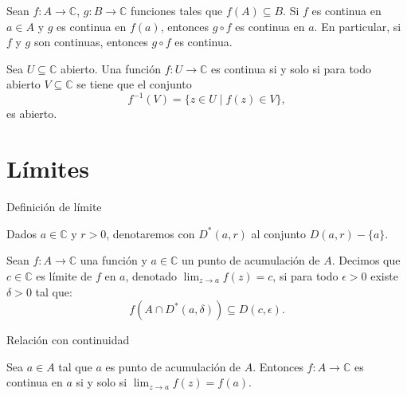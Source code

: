 \documentclass[spanish,presentation]{beamer}
\begin{document}
\begin{frame}[label=sec-1-3]{}
\begin{theorem}
Sean \(f\colon A\to \mathbb{C}\), \(g\colon B\to \mathbb{C}\)
funciones tales que \(f(A)\subseteq B\). Si \(f\) es continua en
\(a\in A\) y \(g\) es continua en \(f(a)\), entonces \(g\circ f\)
es continua en \(a\). En particular, si \(f\) y \(g\) son
continuas, entonces \(g\circ f\) es continua.
\end{theorem}

\begin{theorem}
Sea \(U\subseteq \mathbb{C}\) abierto. Una función \(f\colon U\to
    \mathbb{C}\) es continua si y solo si para todo abierto
\(V\subseteq \mathbb{C}\) se tiene que el conjunto
\begin{displaymath}
f^{-1}(V)=\{z\in U\mid f(z)\in V\},
\end{displaymath}
es abierto.
\end{theorem}
\end{frame}

\section{Límites}
\label{sec-2}

\begin{frame}[label=sec-2-1]{Definición de límite}
\begin{block}{}
Dados \(a\in \mathbb{C}\) y \(r>0\), denotaremos con
\(D^{*}(a,r)\) al conjunto \(D(a,r)-\{a\}\).
\end{block}

\begin{definition}[Límite]
Sean \(f\colon A\to \mathbb{C}\) una función y \(a\in \mathbb{C}\)
un punto de acumulación de \(A\). Decimos que \(c\in \mathbb{C}\)
es \alert{límite de \(f\) en \(a\)}, denotado \(\lim_{z\to a}f(z)=c\), si
para todo \(\epsilon>0\) existe \(\delta>0\) tal que:
\begin{displaymath}
f(A\cap D^{*}(a,\delta))\subseteq D(c,\epsilon).
\end{displaymath}
\end{definition}
\end{frame}

\begin{frame}[label=sec-2-2]{Relación con continuidad}
\begin{theorem}
Sea \(a\in A\) tal que \(a\) es punto de acumulación de
\(A\). Entonces \(f\colon A\to \mathbb{C}\) es continua en \(a\)
si y solo si \(\lim_{z\to a}f(z)=f(a)\).
\end{theorem}
\end{frame}
\end{document}
